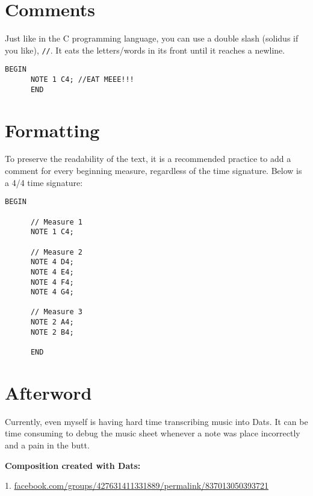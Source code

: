 \documentclass{article}
\begin{document}
\section{Comments}
Just like in the C programming language, you can use a double slash (solidus if you like), \verb+//+.
It eats the letters/words in its front until it reaches a newline.
\begin{Verbatim}[frame=single]
      BEGIN
      NOTE 1 C4; //EAT MEEE!!!
      END
\end{Verbatim}

\section{Formatting}
To preserve the readability of the text, it is a recommended practice to add a comment for every
beginning measure, regardless of the time signature. Below is a 4/4 time signature:
\begin{Verbatim}[frame=single]
      BEGIN

      // Measure 1
      NOTE 1 C4;

      // Measure 2
      NOTE 4 D4;
      NOTE 4 E4;
      NOTE 4 F4;
      NOTE 4 G4;

      // Measure 3
      NOTE 2 A4;
      NOTE 2 B4;

      END
\end{Verbatim}

\section*{Afterword}

Currently, even myself is having hard time transcribing music into Dats. It can be time consuming to debug the music sheet whenever a note was place 
incorrectly and a pain in the butt.

\textbf{Composition created with Dats:}

1. \url{facebook.com/groups/427631411331889/permalink/837013050393721}
\end{document}
